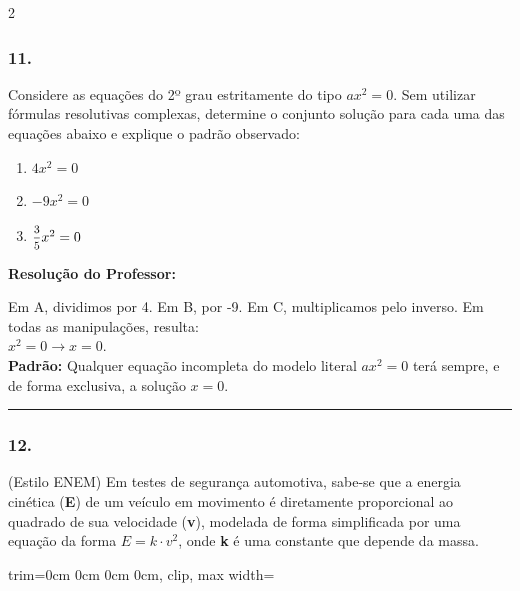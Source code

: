 \begin{multicols*}{2}
\subsubsection*{11.} Considere as equações do 2º grau estritamente do tipo $ ax^2 = 0 $. Sem utilizar fórmulas resolutivas complexas, determine o conjunto solução para cada uma das equações abaixo e explique o padrão observado:
\begin{enumerate}[label=\Alph*), itemsep=\espacoAlt]
    \item $ 4x^2 = 0 $
    \item $ -9x^2 = 0 $
    \item $ \mfrac{3}{5}x^2 = 0 $
\end{enumerate}

\ifgabarito
    \begin{tcolorbox}[colback=CorTitUm!5, colframe=CorTitUm, boxrule=1pt, arc=4pt, left=6pt, right=6pt, top=6pt, bottom=6pt]
    \small\textbf{\textcolor{CorTitUm}{Resolução do Professor:}}\par\vspace{0.1cm}
    \color{CinzaEscuro}
    Em A, dividimos por 4. Em B, por -9. Em C, multiplicamos pelo inverso. Em todas as manipulações, resulta:\\
    $x^2 = 0 \rightarrow x = 0$.\\
    \textbf{Padrão:} Qualquer equação incompleta do modelo literal $ax^2 = 0$ terá sempre, e de forma exclusiva, a solução $x = 0$.
    \end{tcolorbox}
\fi

\par\vspace{\espacoQuestao}

\noindent\textcolor{CorLinha}{\rule{\linewidth}{0.5pt}} 
\par\vspace{\espacoPreQuestao}
\subsubsection*{12.} (Estilo ENEM) Em testes de segurança automotiva, sabe-se que a energia cinética (\textbf{E}) de um veículo em movimento é diretamente proporcional ao quadrado de sua velocidade (\textbf{v}), modelada de forma simplificada por uma equação da forma $ E = k \cdot v^2 $, onde \textbf{k} é uma constante que depende da massa.

\begin{center}
\begin{adjustbox}{trim=0cm 0cm 0cm 0cm, clip, max width=\larguraTikz}
\end{adjustbox}
\end{center}
\end{multicols*}
